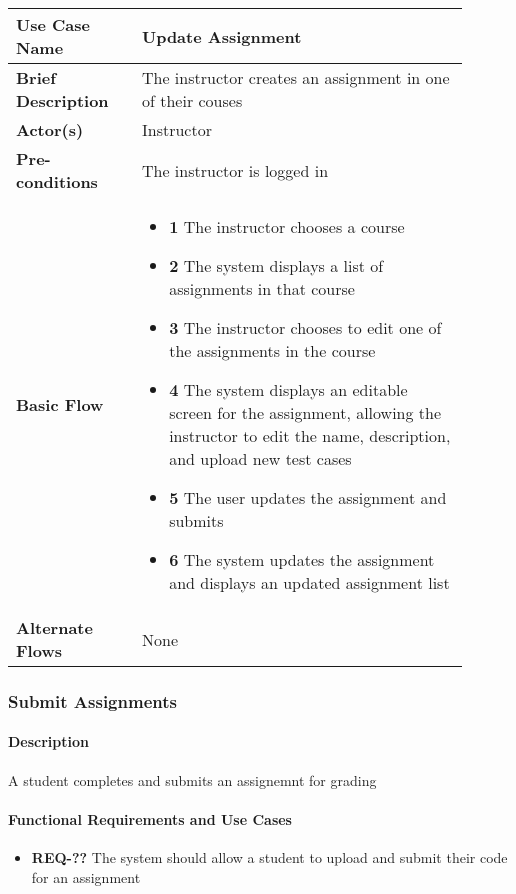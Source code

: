 \documentclass{article}
\begin{document}
\begin{tabular}{| p{0.25\linewidth} | p{0.65\linewidth} |}
  \hline
  \textbf{Use Case Name} & Update Assignment \\
  \hline
  \textbf{Brief Description} & The instructor creates an assignment in one of their couses \\
  \hline
  \textbf{Actor(s)} & Instructor \\
  \hline
  \textbf{Pre-conditions} & The instructor is logged in\\
  \hline
  \textbf{Basic Flow} & \begin{itemize}
    \item[] \textbf{1} The instructor chooses a course
    \item[] \textbf{2} The system displays a list of assignments in that course
    \item[] \textbf{3} The instructor chooses to edit one of the assignments in the course
    \item[] \textbf{4} The system displays an editable screen for the assignment, allowing the instructor to edit the name, description, and upload new test cases
    \item[] \textbf{5} The user updates the assignment and submits
    \item[] \textbf{6} The system updates the assignment and displays an updated assignment list
  \end{itemize}\\
  \hline
  \textbf{Alternate Flows} & None \\
  \hline
\end{tabular}

\subsubsection{Submit Assignments}

\paragraph{Description} A student completes and submits an assignemnt for grading

\paragraph{Functional Requirements and Use Cases}

\begin{itemize}
  \item \textbf{REQ-??} The system should allow a student to upload and submit their code for an assignment
\end{itemize}
\end{document}
